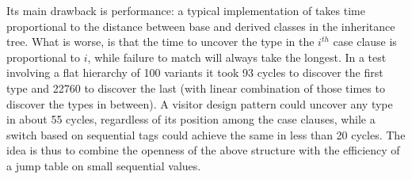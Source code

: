 \noindent
Its main drawback is performance: a typical 
implementation of  takes time proportional to the 
distance between base and derived classes in the inheritance tree.
What is worse, is that the time to uncover the type in the $i^{th}$ case clause 
is proportional to $i$, while failure to match will always take the longest. 
In a test involving a flat hierarchy of 100 variants it took 93 cycles to 
discover the first type and 22760 to discover the last (with linear combination 
of those times to discover the types in between). A visitor design pattern could 
uncover any type in about 55 cycles, regardless of its position among the case 
clauses, while a switch based on sequential tags could achieve the same in less 
than 20 cycles. The idea is thus to combine the openness of the above structure 
with the efficiency of a jump table on small sequential values.



